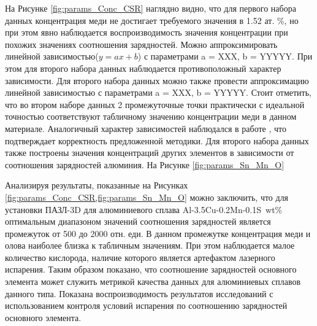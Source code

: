 На Рисунке \cref{fig:params_Conc_CSR} наглядно видно, что для первого набора данных концентрация меди не достигает требуемого значения в 1.52 ат. \%, но при этом явно наблюдается воспроизводимость значения концентрации при похожих значениях соотношения зарядностей. Можно аппроксимировать линейной зависимостью($y = ax + b$) с параметрами a = XXX, b = YYYYY. При этом для второго набора данных наблюдается противоположный характер зависимости. Для второго набора данных можно также провести аппроксимацию линейной зависимостью с параметрами a = XXX, b = YYYYY. Стоит отметить, что во втором наборе данных 2 промежуточные точки практически с идеальной точностью соответствуют табличному значению концентрации меди в данном материале. Аналогичный характер зависимостей наблюдался в работе \cite{Mancini14}, что подтверждает корректность предложенной методики. Для второго набора данных также построены значения концентраций других элементов  в зависимости от соотношения зарядностей алюминия. На Рисунке \cref{fig:params_Sn_Mn_O}


Анализируя результаты, показанные на Рисунках \cref{fig:params_Conc_CSR,fig:params_Sn_Mn_O} можно заключить, что для установки ПАЗЛ-3D для алюминиевого сплава Al-3.5Cu-0.2Mn-0.1S~wt\% оптимальным диапазоном значений соотношения зарядностей является промежуток от 500 до 2000 отн. еди. В данном промежутке концентрация меди и олова наиболее близка к табличным значениям. При этом наблюдается малое количество кислорода, наличие которого является артефактом лазерного испарения. Таким образом показано, что соотношение зарядностей основного элемента может служить метрикой качества данных для алюминиевых сплавов данного типа. Показана воспроизводимость результатов исследований с использованием контроля условий испарения по соотношению зарядностей основного элемента.

